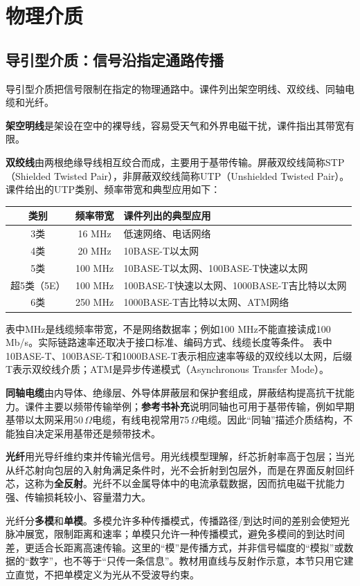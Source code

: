 \section{物理介质}
\subsection{导引型介质：信号沿指定通路传播}
导引型介质把信号限制在指定的物理通路中。课件列出架空明线、双绞线、同轴电缆和光纤。

\textbf{架空明线}是架设在空中的裸导线，容易受天气和外界电磁干扰，课件指出其带宽有限。

\textbf{双绞线}由两根绝缘导线相互绞合而成，主要用于基带传输。屏蔽双绞线简称STP（Shielded Twisted Pair），非屏蔽双绞线简称UTP（Unshielded Twisted Pair）。课件给出的UTP类别、频率带宽和典型应用如下：
\begin{center}
\small
\begin{tabularx}{0.97\textwidth}{c c X}
\toprule
类别 & 频率带宽 & 课件列出的典型应用\\
\midrule
3类 & 16 MHz & 低速网络、电话网络\\
4类 & 20 MHz & 10BASE-T以太网\\
5类 & 100 MHz & 10BASE-T以太网、100BASE-T快速以太网\\
超5类（5E） & 100 MHz & 100BASE-T快速以太网、1000BASE-T吉比特以太网\\
6类 & 250 MHz & 1000BASE-T吉比特以太网、ATM网络\\
\bottomrule
\end{tabularx}
\end{center}
表中MHz是线缆频率带宽，不是网络数据率；例如100 MHz不能直接读成100 Mb/s。实际链路速率还取决于接口标准、编码方式、线缆长度等条件。
表中10BASE-T、100BASE-T和1000BASE-T表示相应速率等级的双绞线以太网，后缀T表示双绞线介质；ATM是异步传递模式（Asynchronous Transfer Mode）。

\textbf{同轴电缆}由内导体、绝缘层、外导体屏蔽层和保护套组成，屏蔽结构提高抗干扰能力。课件主要以频带传输举例；\textbf{参考书补充}说明同轴也可用于基带传输，例如早期基带以太网采用50$\,\Omega$电缆，有线电视常用75$\,\Omega$电缆。因此“同轴”描述介质结构，不能独自决定采用基带还是频带技术。

\textbf{光纤}用光导纤维约束并传输光信号。用光线模型理解，纤芯折射率高于包层；当光从纤芯射向包层的入射角满足条件时，光不会折射到包层外，而是在界面反射回纤芯，这称为\textbf{全反射}。光纤不以金属导体中的电流承载数据，因而抗电磁干扰能力强、传输损耗较小、容量潜力大。

光纤分\textbf{多模}和\textbf{单模}。多模允许多种传播模式，传播路径/到达时间的差别会使短光脉冲展宽，限制距离和速率；单模只允许一种传播模式，避免多模间的到达时间差，更适合长距离高速传输。这里的“模”是传播方式，并非信号幅度的“模拟”或数据的“数字”，也不等于“只传一条信息”。教材用直线与反射作示意，本节只用它建立直觉，不把单模定义为光从不受波导约束。

